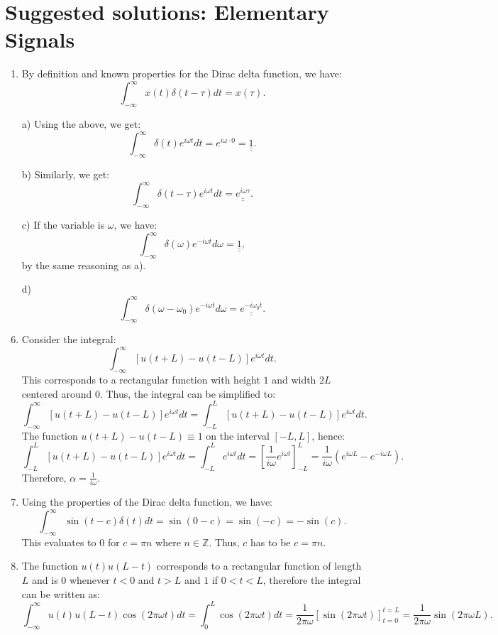 \newpage
\section{Suggested solutions: Elementary Signals}

\begin{enumerate}
\item By definition and known properties for the Dirac delta function, we have:
$$\int_{-\infty}^{\infty}x(t)\delta(t-\tau)dt=x(\tau).$$

\item[a)]
Using the above, we get:
$$\int_{-\infty}^{\infty}\delta(t)e^{i\omega t}dt=e^{i\omega\cdot 0}=\underline{\underline{1}}.$$

\item[b)]
Similarly, we get:
$$\int_{-\infty}^{\infty}\delta(t-\tau)e^{i\omega t}dt=\underline{\underline{e^{i\omega\tau}}}.$$

\item[c)]
If the variable is $\omega$, we have:
$$\int_{-\infty}^{\infty}\delta(\omega)e^{-i\omega t}d\omega=\underline{\underline{1}},$$
by the same reasoning as a). 

\item[d)]
$$\int_{-\infty}^{\infty}\delta(\omega-\omega_{0})e^{-i\omega t}d\omega=\underline{\underline{e^{-i\omega_{0}t}}}.$$

\item Consider the integral:
$$\int_{-\infty}^{\infty}[u(t+L)-u(t-L)]e^{i\omega t}dt.$$
This corresponds to a rectangular function with height $1$ and width $2L$ centered around $0$. Thus, the integral can be simplified to:
$$\int_{-\infty}^{\infty}[u(t+L)-u(t-L)]e^{i\omega t}dt=\int_{-L}^{L}[u(t+L)-u(t-L)]e^{i\omega t}dt.$$
The function $u(t+L)-u(t-L)\equiv 1$ on the interval $[-L,L]$, hence:
$$\int_{-L}^{L}[u(t+L)-u(t-L)]e^{i\omega t}dt=\int_{-L}^{L}e^{i\omega t}dt=\left[\frac{1}{i\omega}e^{i\omega t}\right]_{-L}^{L}=\frac{1}{i\omega}(e^{i\omega L}-e^{-i\omega L}).$$
Therefore, $\alpha=\frac{1}{i\omega}$.

\item Using the properties of the Dirac delta function, we have:
$$\int_{-\infty}^{\infty}\sin(t-c)\delta(t)dt=\sin(0-c)=\sin(-c)=-\sin(c).$$
This evaluates to $0$ for $c=\pi n$ where $n\in\mathbb{Z}$. Thus, $c$ has to be $c=\pi n$.

\item The function $u(t)u(L-t)$ corresponds to a rectangular function of length $L$ and 
is $0$ whenever $t<0$ and $t>L$ and $1$ if $0<t<L$, therefore the integral can be written as:
$$\int_{-\infty}^{\infty}u(t)u(L-t)\cos(2\pi\omega t)dt=\int_{0}^{L}\cos(2\pi\omega t)dt=\frac{1}{2\pi\omega}\left[\sin(2\pi\omega t)\right]_{t=0}^{t=L}=\frac{1}{2\pi\omega}\sin(2\pi\omega L).$$

\end{enumerate}